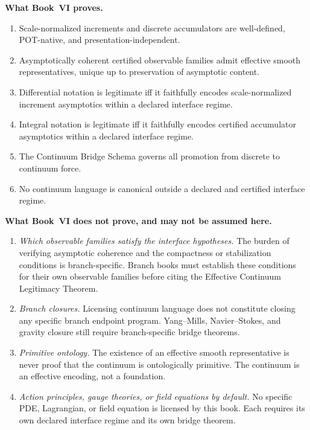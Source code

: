 \documentclass[12pt,oneside]{amsbook}
\theoremstyle{plain}
\theoremstyle{definition}
\theoremstyle{remark}
\begin{document}
\textbf{What Book~VI proves.}
\begin{enumerate}
  \item Scale-normalized increments and discrete accumulators
        are well-defined, POT-native, and presentation-independent.
  \item Asymptotically coherent certified observable families
        admit effective smooth representatives, unique up to
        preservation of asymptotic content.
  \item Differential notation is legitimate iff it faithfully
        encodes scale-normalized increment asymptotics within a
        declared interface regime.
  \item Integral notation is legitimate iff it faithfully
        encodes certified accumulator asymptotics within a
        declared interface regime.
  \item The Continuum Bridge Schema governs all promotion from
        discrete to continuum force.
  \item No continuum language is canonical outside a declared
        and certified interface regime.
\end{enumerate}

\textbf{What Book~VI does not prove, and may not be assumed here.}
\begin{enumerate}
  \item \emph{Which observable families satisfy the interface
        hypotheses.}  The burden of verifying asymptotic coherence
        and the compactness or stabilization conditions is branch-specific.
        Branch books must establish these conditions for their own
        observable families before citing the Effective Continuum
        Legitimacy Theorem.
  \item \emph{Branch closures.}  Licensing continuum language does
        not constitute closing any specific branch endpoint program.
        Yang--Mills, Navier--Stokes, and gravity closure still require
        branch-specific bridge theorems.
  \item \emph{Primitive ontology.}  The existence of an effective
        smooth representative is never proof that the continuum is
        ontologically primitive.  The continuum is an effective
        encoding, not a foundation.
  \item \emph{Action principles, gauge theories, or field equations
        by default.}  No specific PDE, Lagrangian, or field equation
        is licensed by this book.  Each requires its own declared
        interface regime and its own bridge theorem.
\end{enumerate}
\end{document}
